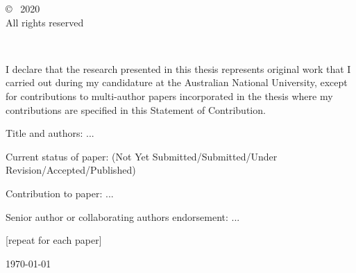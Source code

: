 \vspace*{14cm}
\begin{center}
  \makeatletter
  \copyright\ \@author{} 2020\\All rights reserved
  \makeatother
\end{center}
\noindent
\begin{center}
  \footnotesize{~} %
\end{center}
\noindent

\newpage






\vspace*{7cm}
    I declare that the research presented in this thesis represents original
    work that I carried out during my candidature at the Australian National
    University, except for contributions to multi-author papers incorporated
    in the thesis where my contributions are specified in this Statement of
    Contribution.

    Title and authors: ...

    Current status of paper: (Not Yet Submitted/Submitted/Under Revision/Accepted/Published)

    Contribution to paper: ...

    Senior author or collaborating authors endorsement: ...

    [repeat for each paper]

\vspace*{4cm}

\hspace{8cm}\makeatletter\@author\makeatother\par
\hspace{8cm}\today
